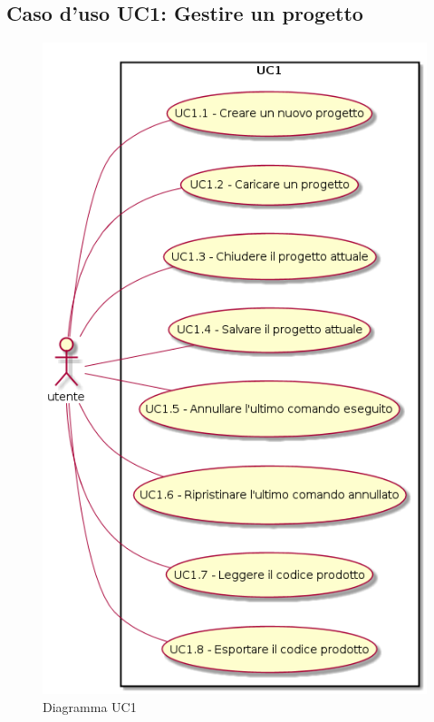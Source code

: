 \documentclass[../AnalisiDeiRequisiti.tex]{subfiles}
\begin{document}
	\subsection{Caso d'uso UC1: Gestire un progetto}
	\begin{figure} [H]
		\centering
		\includegraphics[scale=0.45]{./Figures/UC1.png}
		\caption{Diagramma UC1}\label{}
	\end{figure}
\end{document}
